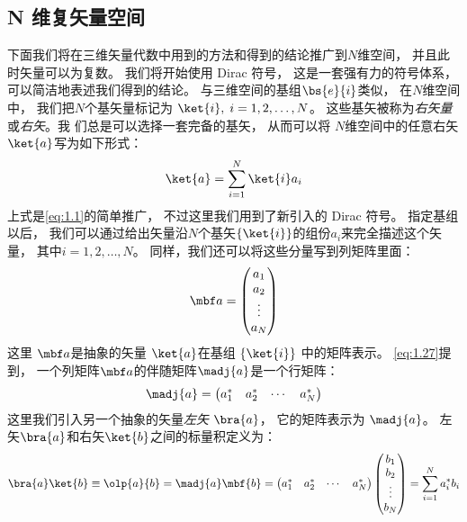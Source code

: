 \subsection{N 维复矢量空间}
\label{sec:1.1.4}
下面我们将在三维矢量代数中用到的方法和得到的结论推广到$N$维空间，
并且此时矢量可以为复数。
我们将开始使用 Dirac 符号，
这是一套强有力的符号体系，
可以简洁地表述我们得到的结论。
与三维空间的基组$\bs{e}{i}$类似，
在$N$维空间中，
我们把$N$个基矢量标记为 $\ket{i},\; i = 1, 2, \dots, N$。
这些基矢被称为\emph{右矢量}或\emph{右矢}。我
们总是可以选择一套完备的基矢，
从而可以将 $N$维空间中的任意右矢 $\ket{a}$写为如下形式：
\begin{equation}
 \ket{a} = \sum_{i=1}^{N} \ket{i} a_i
 \label{eq:1.41}
\end{equation}
上式是\autoref{eq:1.1}的简单推广，
不过这里我们用到了新引入的 Dirac 符号。
指定基组以后，
我们可以通过给出矢量沿$N$个基矢$\left\{\ket{i}\right\}$的组份$a_i$来完全描述这个矢量，
其中$i = 1, 2, \dots, N$。
同样，我们还可以将这些分量写到列矩阵里面：
\begin{equation}
 {\mbf a} = \begin{pmatrix}
     a_1 \\ a_2 \\ \vdots \\ a_N
 \end{pmatrix}
 \label{eq:1.42}
\end{equation}
这里 $\mbf a$是抽象的矢量 $\ket{a}$在基组 $\left\{\ket{i}\right\}$ 中的矩阵表示。
\autoref{eq:1.27}提到，
一个列矩阵$\mbf a$的伴随矩阵$\madj{a}$是一个行矩阵：
\begin{equation}
 \madj{a} = \begin{pmatrix}
     a_1^\ast & a_2^\ast &\cdots &a_N^\ast
 \end{pmatrix}
 \label{eq:1.43}
\end{equation}
这里我们引入另一个抽象的矢量\emph{左矢} $\bra{a}$，
它的矩阵表示为 $\madj{a}$。
左矢$\bra{a}$和右矢$\ket{b}$之间的标量积定义为：
\begin{equation}
 \bra{a}\ket{b} \equiv \olp{a}{b} = \madj{a}\mbf{b} = \begin{pmatrix}
     a_1^\ast & a_2^\ast &\cdots &a_N^\ast
 \end{pmatrix} \begin{pmatrix}
     b_1 \\ b_2 \\ \vdots \\ b_N
 \end{pmatrix} = \sum_{i=1}^N a_i^\ast b_i
 \label{eq:1.44}
\end{equation}
